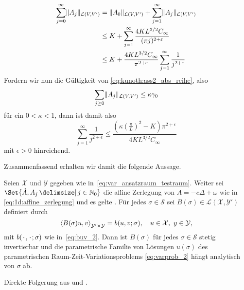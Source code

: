 \begin{Satz}
\begin{Beweis}
        \begin{align}
                    \sum_{j = 0}^{\infty} \lVert A_{j}\rVert_{\mathcal L(V, V')}
            &= \lVert A_{0}\rVert_{\mathcal L(V, V')} + \sum_{j = 1}^{\infty} \lVert A_{j}\rVert_{\mathcal L(V, V')}
            \\&\leq K + \sum_{j = 1}^{\infty} \frac{4 K L^{3 / 2} C_{\infty}}{(\pi j)^{2 + \varepsilon}}
            \\&\leq K + \frac{4 K L^{3 / 2} C_{\infty}}{\pi^{2+ \varepsilon}} \sum_{j = 1}^{\infty} \frac{1}{j^{2 + \varepsilon}}
        \end{align}
        Fordern wir nun die Gültigkeit von \eqref{eq:kunoth:ass2_abs_reihe}, also
        \begin{equation}
            \sum_{j \geq 0} \lVert A_{j}\rVert_{\mathcal L(V, V')} \leq \kappa \gamma_{0}
        \end{equation}
        für ein $0 < \kappa < 1$, dann ist damit also
        \begin{equation}
            \sum_{j = 1}^{\infty} \frac{1}{j^{2 + \epsilon}} \leq \frac{(\kappa (\tfrac{\pi}{L})^{2} - K) \pi^{2+ \epsilon}}{4 K L^{3/2} C_{\infty}}
        \end{equation}
        mit $\epsilon > 0$ hinreichend.
    \end{Beweis}
\end{Satz}

Zusammenfassend erhalten wir damit die folgende Aussage.

\begin{Satz}
    Seien $\mathcal X$ und $\mathcal Y$ gegeben wie in~\eqref{eq:var_ansatzraum_testraum}.
    Weiter sei $\Set{\hat A, A_{j} \given j \in \mathbb{N}_{0}}$ die affine Zerlegung von $A = -c \Delta + \omega$ wie in \eqref{eq:1d:affine_zerlegung} und es gelte .
    Für jedes $\sigma \in \mathcal S$ sei $B(\sigma) \in \mathcal L(\mathcal X, \mathcal Y')$ definiert durch
    \begin{equation}
        \label{eq:var_all_gross_b_parametrisch}
        \left\langle B(\sigma) u,v\right\rangle_{\mathcal Y' \times \mathcal Y} = b(u, v; \sigma), \quad u \in \mathcal X,~y \in \mathcal Y,
    \end{equation}
    mit $b({\mkern2mu\cdot\mkern2mu}, {\mkern2mu\cdot\mkern2mu}; \sigma)$ wie in~\eqref{eq:buv_2}.
    Dann ist $B(\sigma)$ für jedes $\sigma \in \mathcal S$ stetig invertierbar und die parametrische Familie von Lösungen $u(\sigma)$ des parametrischen Raum-Zeit-Variationsproblems \eqref{eq:varprob_2} hängt analytisch von $\sigma$ ab.

    \begin{Beweis}
        Direkte Folgerung aus  und .
    \end{Beweis}
\end{Satz}

